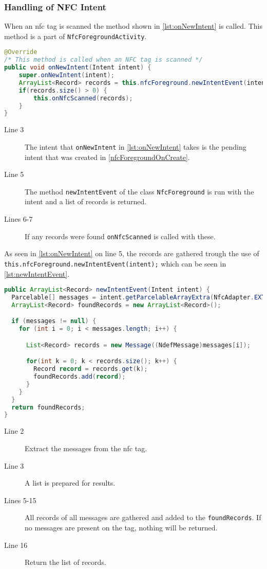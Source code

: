 \subsubsection{Handling of NFC Intent}
When an \ac{nfc} tag is scanned the method shown in \autoref{lst:onNewIntent} is called. This method is a part of \lstinline|NfcForegroundActivity|.
\begin{lstlisting}[language=java, label=lst:onNewIntent, caption=onNewIntent]
@Override
/* This method is called when an NFC tag is scanned */
public void onNewIntent(Intent intent) { 
    super.onNewIntent(intent);
    ArrayList<Record> records = this.nfcForeground.newIntentEvent(intent);
    if(records.size() > 0) {
        this.onNfcScanned(records);
    }
}  
\end{lstlisting}
\begin{description}
\item[Line 3] The intent that \lstinline|onNewIntent| in \autoref{lst:onNewIntent} takes is the pending intent that was created in \autoref{nfcForegroundOnCreate}.
\item[Line 5] The method \lstinline|newIntentEvent| of the class \lstinline|NfcForeground| is run with the intent and a list of records is returned.
\item[Lines 6-7] If any records were found \lstinline|onNfcScanned| is called with these.
\end{description}
As seen in \autoref{lst:onNewIntent} on line 5, the records are gathered trough the use of \lstinline|this.nfcForeground.newIntentEvent(intent);| which can be seen in \autoref{lst:newIntentEvent}.

\begin{lstlisting}[language=java, label=lst:newIntentEvent, caption=newIntentEvent]
public ArrayList<Record> newIntentEvent(Intent intent) {
  Parcelable[] messages = intent.getParcelableArrayExtra(NfcAdapter.EXTRA_NDEF_MESSAGES);
  ArrayList<Record> foundRecords = new ArrayList<Record>();

  if (messages != null) {
    for (int i = 0; i < messages.length; i++) {

      List<Record> records = new Message((NdefMessage)messages[i]);

      for(int k = 0; k < records.size(); k++) {
        Record record = records.get(k);
        foundRecords.add(record);
      }
    }
  }
  return foundRecords;
}
\end{lstlisting}
\begin{description}
\item[Line 2] Extract the messages from the \ac{nfc} tag.
\item[Line 3] A list is prepared for results.
\item[Lines 5-15] All records of all messages are gathered and added to the \lstinline|foundRecords|. If no messages are present on the tag, nothing will be returned.
\item[Line 16] Return the list of records.
\end{description}

